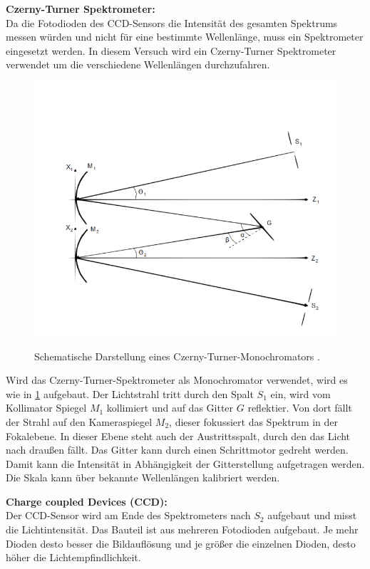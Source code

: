 \documentclass[.../bericht]{subfilies}
\begin{document}
    \textbf{Czerny-Turner Spektrometer:}\\
    Da die Fotodioden des CCD-Sensors die Intensität des gesamten Spektrums messen würden und nicht für eine bestimmte Wellenlänge, muss ein Spektrometer eingesetzt werden. In diesem Versuch wird ein Czerny-Turner Spektrometer verwendet um die verschiedene Wellenlängen durchzufahren.

    \begin{figure}[tb]
      \begin{center}
        \fbox
        {
          \includegraphics[scale=0.5]{figures/spektrometer}
        }
        \caption{Schematische Darstellung eines Czerny-Turner-Monochromators \cite{czerny}.
        }
        \label{fig:spektrometer}
      \end{center}
    \end{figure}

    Wird das Czerny-Turner-Spektrometer als Monochromator verwendet, wird es wie in \cref{fig:spektrometer} aufgebaut. Der Lichtstrahl tritt durch den Spalt $S_1$ ein, wird vom Kollimator Spiegel $M_1$ kollimiert und auf das Gitter $G$ reflektier. Von dort fällt der Strahl auf den Kameraspiegel $M_2$, dieser fokussiert das Spektrum in der Fokalebene. In dieser Ebene steht auch der Austrittsspalt, durch den das Licht nach draußen fällt. Das Gitter kann durch einen Schrittmotor gedreht werden. Damit kann die Intensität in Abhängigkeit der Gitterstellung aufgetragen werden. Die Skala kann über bekannte Wellenlängen kalibriert werden.
    \cite{czerny}\\
    \medskip

    \textbf{Charge coupled Devices (CCD):}\\
    Der CCD-Sensor wird am Ende des Spektrometers  nach $S_2$ aufgebaut und misst die Lichtintensität. Das Bauteil ist aus mehreren Fotodioden aufgebaut. Je mehr Dioden desto besser die Bildauflösung und je größer die einzelnen Dioden, desto höher die Lichtempfindlichkeit.

    \cite{wiki:ccd}
\end{document}
